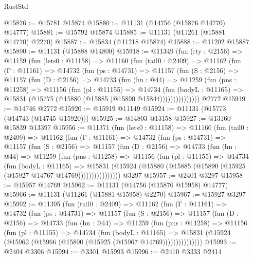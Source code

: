 \begin{lexlean}{RustStd}
\begin{coremodule}
@15876 := @15781 @15874
@15880 := @11131 (@14756 (@15876 @14770) @14777)
@15881 := @15792 @15874
@15885 := @11131 (@11261 (@15881 @14770) @2270)
@15887 := @15834 (@11218 @15874)
@15888 := @11202 @15887
@15890 := @11131 (@15888 @14800)
@15918 := @11349
    (fun (rty : @2156) =>
    @11159
      (fun (lets0 : @11158) =>
      @11160
        (fun (tail0 : @2409) =>
        @11162
          (fun (Γ : @11161) =>
          @14732
            (fun (ps : @14731) =>
            @11157
              (fun (S : @2156) =>
              @11157
                (fun (D : @2156) =>
                @14733
                  (fun (hn : @44) =>
                  @11259
                    (fun (pns : @11258) =>
                    @11156
                      (fun (pl : @11155) =>
                      @14734
                        (fun (bodyL : @11165) =>
                        @15831 (@15775 (@15880 (@15885 (@15890 @15844)))))))))))))))
    @2772
@15919 := @14746 @2772
@15920 := @15919 @11149
@15924 := @11131 (@15773 (@14743 (@14745 @15920)))
@15925 := @14803 @13158
@15927 := @13160 @15839 @13397
@15956 := @11371
    (fun (lets0 : @11158) =>
    @11160
      (fun (tail0 : @2409) =>
      @11162
        (fun (Γ : @11161) =>
        @14732
          (fun (ps : @14731) =>
          @11157
            (fun (S : @2156) =>
            @11157
              (fun (D : @2156) =>
              @14733
                (fun (hn : @44) =>
                @11259
                  (fun (pns : @11258) =>
                  @11156
                    (fun (pl : @11155) =>
                    @14734
                      (fun (bodyL : @11165) =>
                      @15831
                        (@15924
                          (@15880 (@15885 (@15890 (@15925 (@15927 @14767 @14769))))))))))))))))
    @3297
@15957 := @2401 @3297
@15958 := @15957 @14769
@15962 := @11131 (@14756 (@15876 @15958) @14777)
@15966 := @11131 (@11261 (@15881 @15958) @2270)
@15967 := @15927 @3297
@15992 := @11395
    (fun (tail0 : @2409) =>
    @11162
      (fun (Γ : @11161) =>
      @14732
        (fun (ps : @14731) =>
        @11157
          (fun (S : @2156) =>
          @11157
            (fun (D : @2156) =>
            @14733
              (fun (hn : @44) =>
              @11259
                (fun (pns : @11258) =>
                @11156
                  (fun (pl : @11155) =>
                  @14734
                    (fun (bodyL : @11165) =>
                    @15831 (@15924 (@15962 (@15966 (@15890 (@15925 (@15967 @14769)))))))))))))))
@15993 := @2404 @3306
@15994 := @3301 @15993
@15996 := @2410 @3333 @2414

\end{coremodule}
\end{lexlean}
